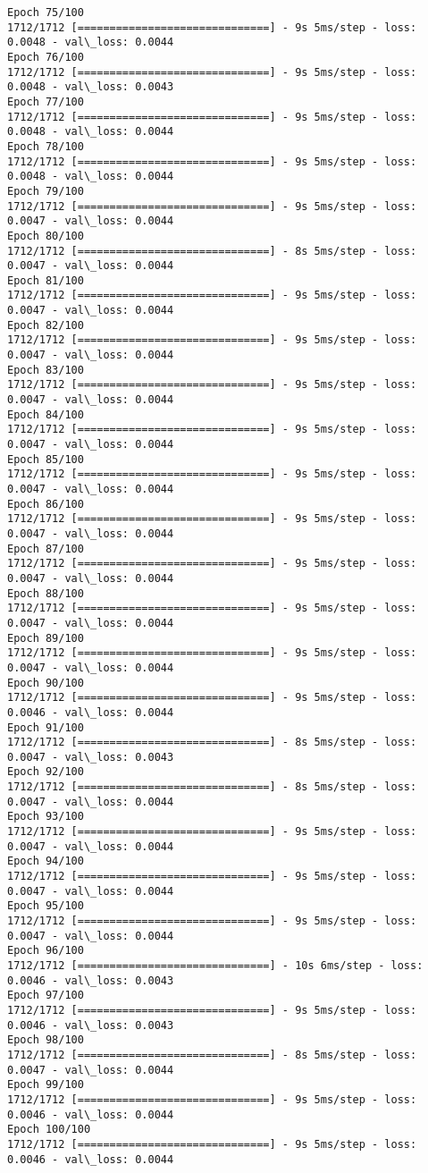 \documentclass[11pt]{article}
\begin{document}
\begin{Verbatim}[commandchars=\\\{\}]
Epoch 75/100
1712/1712 [==============================] - 9s 5ms/step - loss: 0.0048 - val\_loss: 0.0044
Epoch 76/100
1712/1712 [==============================] - 9s 5ms/step - loss: 0.0048 - val\_loss: 0.0043
Epoch 77/100
1712/1712 [==============================] - 9s 5ms/step - loss: 0.0048 - val\_loss: 0.0044
Epoch 78/100
1712/1712 [==============================] - 9s 5ms/step - loss: 0.0048 - val\_loss: 0.0044
Epoch 79/100
1712/1712 [==============================] - 9s 5ms/step - loss: 0.0047 - val\_loss: 0.0044
Epoch 80/100
1712/1712 [==============================] - 8s 5ms/step - loss: 0.0047 - val\_loss: 0.0044
Epoch 81/100
1712/1712 [==============================] - 9s 5ms/step - loss: 0.0047 - val\_loss: 0.0044
Epoch 82/100
1712/1712 [==============================] - 9s 5ms/step - loss: 0.0047 - val\_loss: 0.0044
Epoch 83/100
1712/1712 [==============================] - 9s 5ms/step - loss: 0.0047 - val\_loss: 0.0044
Epoch 84/100
1712/1712 [==============================] - 9s 5ms/step - loss: 0.0047 - val\_loss: 0.0044
Epoch 85/100
1712/1712 [==============================] - 9s 5ms/step - loss: 0.0047 - val\_loss: 0.0044
Epoch 86/100
1712/1712 [==============================] - 9s 5ms/step - loss: 0.0047 - val\_loss: 0.0044
Epoch 87/100
1712/1712 [==============================] - 9s 5ms/step - loss: 0.0047 - val\_loss: 0.0044
Epoch 88/100
1712/1712 [==============================] - 9s 5ms/step - loss: 0.0047 - val\_loss: 0.0044
Epoch 89/100
1712/1712 [==============================] - 9s 5ms/step - loss: 0.0047 - val\_loss: 0.0044
Epoch 90/100
1712/1712 [==============================] - 9s 5ms/step - loss: 0.0046 - val\_loss: 0.0044
Epoch 91/100
1712/1712 [==============================] - 8s 5ms/step - loss: 0.0047 - val\_loss: 0.0043
Epoch 92/100
1712/1712 [==============================] - 8s 5ms/step - loss: 0.0047 - val\_loss: 0.0044
Epoch 93/100
1712/1712 [==============================] - 9s 5ms/step - loss: 0.0047 - val\_loss: 0.0044
Epoch 94/100
1712/1712 [==============================] - 9s 5ms/step - loss: 0.0047 - val\_loss: 0.0044
Epoch 95/100
1712/1712 [==============================] - 9s 5ms/step - loss: 0.0047 - val\_loss: 0.0044
Epoch 96/100
1712/1712 [==============================] - 10s 6ms/step - loss: 0.0046 - val\_loss: 0.0043
Epoch 97/100
1712/1712 [==============================] - 9s 5ms/step - loss: 0.0046 - val\_loss: 0.0043
Epoch 98/100
1712/1712 [==============================] - 8s 5ms/step - loss: 0.0047 - val\_loss: 0.0044
Epoch 99/100
1712/1712 [==============================] - 9s 5ms/step - loss: 0.0046 - val\_loss: 0.0044
Epoch 100/100
1712/1712 [==============================] - 9s 5ms/step - loss: 0.0046 - val\_loss: 0.0044

    \end{Verbatim}
\end{document}
